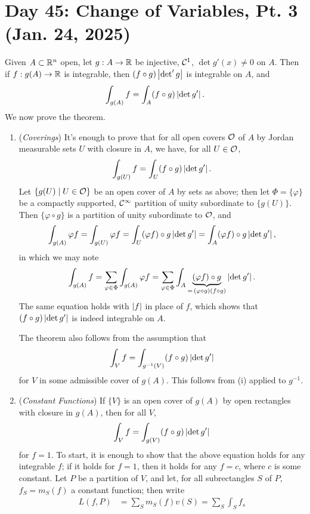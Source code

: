 \section{Day 45: Change of Variables, Pt. 3 (Jan. 24, 2025)}
Given $A \subset \mathbb R^n$ open, let $g : A \to \mathbb R$ be injective, $\mathcal C^1$, $\det g'(x) \neq 0$ on $A$. Then if $f : g(A) \to \mathbb R$ is integrable, then $(f \circ g) \left\lvert \det' g \right\rvert$ is integrable on $A$, and
\[ \int_{g(A)} f = \int_A (f \circ g) \left\lvert \det g' \right\rvert. \]
We now prove the theorem.
\begin{enumerate}[label=(\roman*)]
    \item (\textit{Coverings}) It's enough to prove that for all open covers $\mathcal O$ of $A$ by Jordan measurable sets $U$ with closure in $A$, we have, for all $U \in \mathcal O$,
    \[ \int_{g(U)} f = \int_U (f \circ g) \left\lvert \det g' \right\rvert. \]
    Let $\{g(U) \mid U \in \mathcal O\}$ be an open cover of $A$ by sets as above; then let $\Phi = \{\varphi\}$ be a compactly supported, $\mathcal C^\infty$ partition of unity subordinate to $\{g(U)\}$. Then $\{\varphi \circ g\}$ is a partition of unity subordinate to $\mathcal O$, and
    \[ \int_{g(A)} \varphi f = \int_{g(U)} \varphi f = \int_U (\varphi f) \circ g \left\lvert \det g' \right\rvert = \int_A (\varphi f) \circ g \left\lvert \det g' \right\rvert, \]
    in which we may note
    \[ \int_{g(A)} f = \sum_{\varphi \in \Phi} \int_{g(A)} \varphi f = \sum_{\varphi \in \Phi} \int_A \underbrace{(\varphi f) \circ g}_{= \, (\varphi \circ g)(f \circ g)} \left\lvert \det g' \right\rvert. \]
    The same equation holds with $\left\lvert f \right\rvert$ in place of $f$, which shows that $(f \circ g) \left\lvert \det g' \right\rvert$ is indeed integrable on $A$.
    \begin{remark}
        The theorem also follows from the assumption that
        \[ \int_V f = \int_{g^{-1}(V)} (f \circ g)\left\lvert \det g' \right\rvert \]
        for $V$ in some admissible cover of $g(A)$. This follows from (i) applied to $g^{-1}$.
    \end{remark}
    \item (\textit{Constant Functions}) If $\{V\}$ is an open cover of $g(A)$ by open rectangles with closure in $g(A)$, then for all $V$,
    \[ \int_V f = \int_{g(V)} (f \circ g) \left\lvert \det g' \right\rvert \]
    for $f = 1$. To start, it is enough to show that the above equation holds for any integrable $f$; if it holds for $f = 1$, then it holds for any $f = c$, where $c$ is some constant. Let $P$ be a partition of $V$, and let, for all subrectangles $S$ of $P$, $f_S = m_S(f)$ a constant function; then write
    \begin{align*}
        L(f, P) &= \sum_S m_S(f) v(S) = \sum_S \int_S f_s \\

\end{align*}
\end{enumerate}
